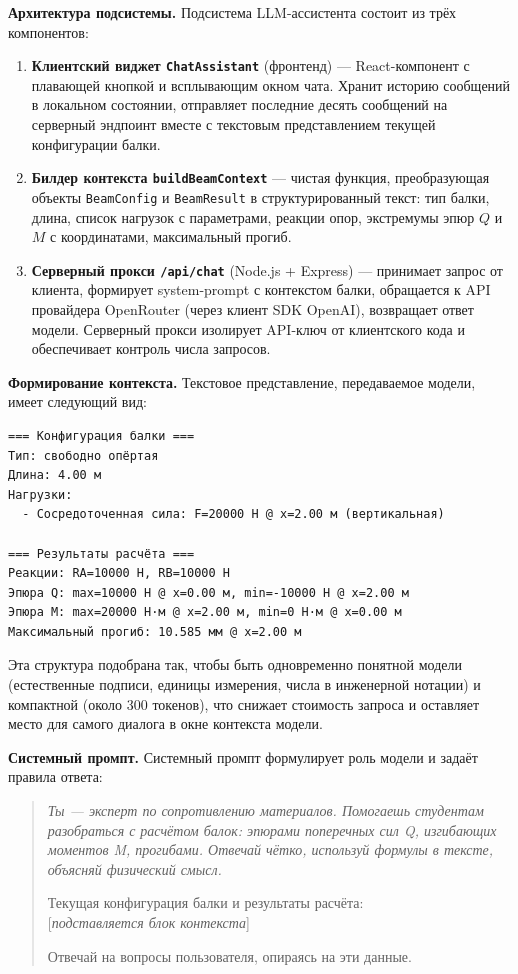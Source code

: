 \textbf{Архитектура подсистемы.} Подсистема LLM-ассистента состоит из трёх компонентов:

\begin{enumerate}
  \item \textbf{Клиентский виджет \texttt{ChatAssistant}} (фронтенд) --- React-компонент с плавающей кнопкой и всплывающим окном чата. Хранит историю сообщений в локальном состоянии, отправляет последние десять сообщений на серверный эндпоинт вместе с текстовым представлением текущей конфигурации балки.
  \item \textbf{Билдер контекста \texttt{buildBeamContext}} --- чистая функция, преобразующая объекты \texttt{BeamConfig} и \texttt{BeamResult} в структурированный текст: тип балки, длина, список нагрузок с параметрами, реакции опор, экстремумы эпюр $Q$ и $M$ с координатами, максимальный прогиб.
  \item \textbf{Серверный прокси \texttt{/api/chat}} (Node.js + Express) --- принимает запрос от клиента, формирует system-prompt с контекстом балки, обращается к API провайдера OpenRouter (через клиент SDK OpenAI), возвращает ответ модели. Серверный прокси изолирует API-ключ от клиентского кода и обеспечивает контроль числа запросов.
\end{enumerate}

\textbf{Формирование контекста.} Текстовое представление, передаваемое модели, имеет следующий вид:
\begin{lstlisting}[basicstyle=\small\ttfamily, frame=single, numbers=none, breaklines=true]
=== Конфигурация балки ===
Тип: свободно опёртая
Длина: 4.00 м
Нагрузки:
  - Сосредоточенная сила: F=20000 Н @ x=2.00 м (вертикальная)

=== Результаты расчёта ===
Реакции: RA=10000 Н, RB=10000 Н
Эпюра Q: max=10000 Н @ x=0.00 м, min=-10000 Н @ x=2.00 м
Эпюра M: max=20000 Н·м @ x=2.00 м, min=0 Н·м @ x=0.00 м
Максимальный прогиб: 10.585 мм @ x=2.00 м
\end{lstlisting}

Эта структура подобрана так, чтобы быть одновременно понятной модели (естественные подписи, единицы измерения, числа в инженерной нотации) и компактной (около 300 токенов), что снижает стоимость запроса и оставляет место для самого диалога в окне контекста модели.

\textbf{Системный промпт.} Системный промпт формулирует роль модели и задаёт правила ответа:
\begin{quote}
\itshape
Ты --- эксперт по сопротивлению материалов. Помогаешь студентам разобраться с расчётом балок: эпюрами поперечных сил Q, изгибающих моментов M, прогибами. Отвечай чётко, используй формулы в тексте, объясняй физический смысл.

Текущая конфигурация балки и результаты расчёта:\\
\textnormal{[\textit{подставляется блок контекста}]}

Отвечай на вопросы пользователя, опираясь на эти данные.
\end{quote}

